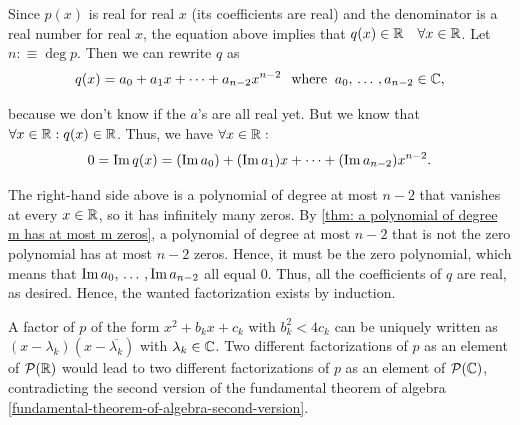 \begin{prf}
  Since $p(x)$ is real for real $x$ (its coefficients are real) and the denominator is a real number for real $x$, the equation above implies that $q(x) \in \mathbb{R} \quad \forall x \in \mathbb{R}$. Let $n :\equiv \deg p$. Then we can rewrite $q$ as
  \[
    q(x) = a_0 + a_1 x + \cdots + a_{n-2} x^{n-2} \;\;\, \text{where}\;\; a_0, {\, \ldots \,\,}, a_{n-2} \in \mathbb{C},
  \]

  because we don't know if the $a$'s are all real yet. But we know that $\forall x \in \mathbb{R}: q(x) \in \mathbb{R}$. Thus, we have $\forall x \in \mathbb{R}:$
  \[
    0 = \operatorname{Im} q(x) = (\operatorname{Im} a_0) + (\operatorname{Im} a_1)x + \cdots + (\operatorname{Im} a_{n-2})x^{n-2}.
  \]

  The right-hand side above is a polynomial of degree at most $n-2$ that vanishes at every $x \in \mathbb{R}$, so it has infinitely many zeros. By \ref{thm: a polynomial of degree m has at most m zeros}, a polynomial of degree at most $n-2$ that is not the zero polynomial has at most $n-2$ zeros. Hence, it must be the zero polynomial, which means that $\operatorname{Im} a_0, {\, \ldots \,\,}, \operatorname{Im} a_{n-2}$ all equal $0$. Thus, all the coefficients of $q$ are real, as desired. Hence, the wanted factorization exists by induction.

   A factor of $p$ of the form $x^2 + b_kx + c_k$ with $b_k^2 < 4c_k$ can be uniquely written as $(x-\lambda_k)(x-\overline{\lambda_k})$ with $\lambda_k \in \mathbb{C}$. Two different factorizations of $p$ as an element of $\mathcal{P}(\mathbb{R})$ would lead to two different factorizations of $p$ as an element of $\mathcal{P}(\mathbb{C})$, contradicting the second version of the fundamental theorem of algebra \ref{fundamental-theorem-of-algebra-second-version}.
\end{prf}

